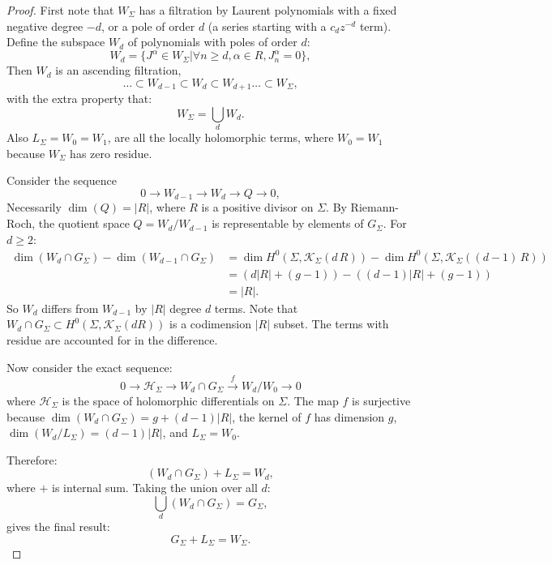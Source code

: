         
        \begin{proof}
        First note that \(W_\Sigma\) has a filtration by Laurent polynomials with a fixed negative degree \(-d\), or a pole of order \(d\) (a series starting with a \(c_{d} z^{-d}\) term). Define the subspace \(W_d\) of polynomials with poles of order \(d\):
        \[ W_d = \{ J^{\alpha} \in  W_\Sigma | \forall  n \geq d, \alpha \in R, J^{\alpha}_n = 0\},\]
        Then \( W_d\) is an ascending filtration,
        \[ \dots \subset W_{d-1} \subset W_d \subset W_{d+1} \dots \subset W_\Sigma,\] with the extra property that:
        \[ W_\Sigma = \bigcup_{d} W_d.\]
        Also \(L_\Sigma = W_0 = W_1 \), are all the locally holomorphic terms, where \(W_0 = W_1 \) because \(W_\Sigma\) has zero residue. 
        
        Consider the sequence
        \[ 0 \rightarrow W_{d-1} \rightarrow W_{d} \rightarrow Q \rightarrow 0,\]
        Necessarily \(\dim(Q) = |R|\), where \(R\) is a positive divisor on \(\Sigma\). By Riemann-Roch, the quotient space \(Q = W_d/W_{d-1}\) is representable by elements of \(G_\Sigma\). For \(d \geq 2\):
        \begin{align*}
        \dim(W_d\cap G_\Sigma)-\dim(W_{d-1}\cap G_\Sigma)
        &=\dim H^0(\Sigma,\mathcal{K}_\Sigma( d \, R))-\dim H^0(\Sigma,\mathcal{K}_\Sigma((d-1)\, R))\\
        &=\left( d|R|+(g-1)\right)-\left((d-1)|R|+(g-1)\right)\\
        &=|R|.
        \end{align*}
        So \(W_d\) differs from \(W_{d-1}\) by \(|R|\) degree \(d\) terms.
        Note that \( W_d \cap G_\Sigma \subset H^0( \Sigma, \mathcal{K}_\Sigma(d R))\) is a codimension \(|R|\) subset. The terms with residue are accounted for in the difference.
        
        
        Now consider the exact sequence:
        \[ 0 \rightarrow \mathcal{H}_\Sigma \rightarrow W_d \cap G_\Sigma \overset{f}{\rightarrow} W_d/ W_0 \rightarrow 0 \]
        where \(\mathcal{H}_\Sigma\) is the space of holomorphic differentials on \(\Sigma\). The map \(f\) is surjective because \( \dim(W_d \cap G_\Sigma) = g + (d-1) |R|\), the kernel of \(f\) has dimension \(g\), \( \dim(W_d/L_\Sigma) = (d-1) |R|\), and \( L_\Sigma = W_0\).
        
        Therefore:
        \[ (W_d \cap G_\Sigma)  + L_\Sigma = W_d,\]
        where \(+\) is internal sum. Taking the union over all \(d\):
        \[ \bigcup_{d}( W_d \cap G_\Sigma ) = G_\Sigma,\]
        gives the final result:
        \[G_\Sigma  + L_{\Sigma} = W_\Sigma  .\]
        

\end{proof}

